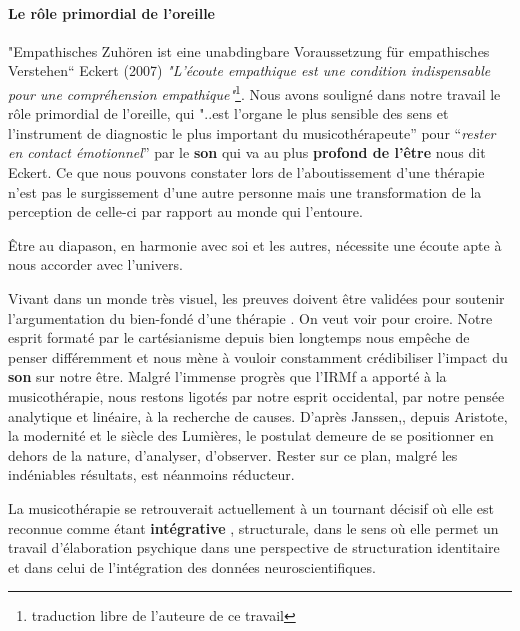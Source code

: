 \paragraph{Le rôle primordial de l'oreille}



"Empathisches Zuhören ist eine unabdingbare Voraussetzung für empathisches Verstehen“ 
\autocite[p.46]{seminar_zuerich} Eckert (2007)
\textit{"L'écoute empathique est une condition indispensable
	pour une compréhension empathique"}\footnote{traduction libre de l'auteure de ce travail}.
Nous avons souligné dans notre travail le rôle primordial de
l'oreille, qui "..est l'organe le plus sensible des
sens et l'instrument de diagnostic le plus important du
musicothérapeute'' pour ``\textit{rester en contact émotionnel}'' par le \textbf{son} qui va au plus 
\textbf{profond de
	l'être} nous dit Eckert.
Ce que nous pouvons constater lors de l'aboutissement
d'une thérapie n'est pas le surgissement d'une autre personne mais une transformation
de la perception de celle-ci par rapport au monde qui l'entoure.


Être au diapason, en harmonie avec soi et les autres, nécessite une
écoute apte à nous accorder avec l'univers.

Vivant dans un monde très visuel, les preuves doivent être
validées pour soutenir l'argumentation du bien-fondé d'une thérapie
\autocite[ch. II, pp. 105--106 ]{vrait_musicotherapie_2018}.
      On veut voir pour croire.
Notre esprit formaté par le cartésianisme depuis bien longtemps nous
empêche de penser différemment
et nous mène à vouloir constamment crédibiliser l'impact
du \textbf{son} sur notre être.
Malgré l'immense progrès que l'IRMf a apporté à la musicothérapie, nous restons
  ligotés par notre esprit occidental, par
  notre pensée analytique et linéaire, à la recherche de
  causes.
  D'après Janssen,\autocite[201]{van_eersel_cerveau}, depuis Aristote, la modernité et le
siècle des Lumières, le postulat demeure de se positionner en dehors
de la nature, d'analyser, d'observer.
Rester sur ce plan, malgré les
indéniables résultats, est néanmoins
réducteur.

La musicothérapie  se retrouverait actuellement
 à un tournant décisif où elle est reconnue comme étant
 \textbf{ intégrative} \autocite[ch. III, p. 53,
 105]{vrait_musicotherapie_2018},
struc\-tu\-rale, dans le sens où elle permet un travail d'élaboration psychique dans une perspective de structuration identitaire  et dans celui de l'intégration des données neuroscientifiques.

